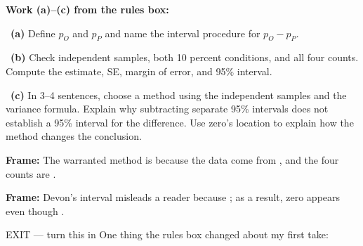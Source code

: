 \documentclass[11pt]{article}
\begin{document}
\newpage
\textbf{Work (a)--(c) from the rules box:}\par\smallskip

~\textbf{(a)} Define $p_O$ and $p_P$ and name the interval procedure for $p_O-p_P$.\par
\workspace{0.7in}

~\textbf{(b)} Check independent samples, both 10 percent conditions, and all four counts. Compute the estimate, SE, margin of error, and 95\% interval.\par
\workspace{1.4in}

~\textbf{(c)} In 3--4 sentences, choose a method using the independent samples and the variance formula. Explain why subtracting separate 95\% intervals does not establish a 95\% interval for the difference. Use zero's location to explain how the method changes the conclusion.\par
\workspace{2.0in}

\begin{sentenceframebox}\raggedright\textbf{Frame:} The warranted method is \blank[1.0in] because the data come from \blank[2.2in], and the four counts are \blank[1.5in].\end{sentenceframebox}

\begin{sentenceframebox}\raggedright\textbf{Frame:} Devon's interval misleads a reader because \blank[2.4in]; as a result, zero appears \blank[0.8in] even though \blank[2.2in].\end{sentenceframebox}

\begin{summaryexitbox}{EXIT --- turn this in}
One thing the rules box changed about my first take: \hrulefill\par
\workspace{0.4in}
\end{summaryexitbox}
\end{document}
